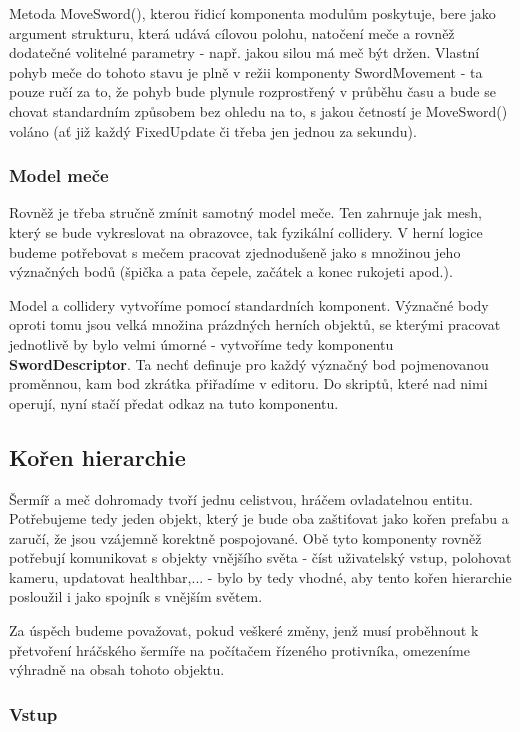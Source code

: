 Metoda MoveSword(), kterou řidicí komponenta modulům poskytuje, bere jako argument strukturu, která udává cílovou polohu, natočení meče a rovněž dodatečné volitelné parametry - např. jakou silou má meč být držen. Vlastní pohyb meče do tohoto stavu je plně v režii komponenty SwordMovement - ta pouze ručí za to, že pohyb bude plynule rozprostřený v průběhu času a bude se chovat standardním způsobem bez ohledu na to, s jakou četností je MoveSword() voláno (ať již každý FixedUpdate či třeba jen jednou za sekundu).

\subsubsection*{Model meče}

Rovněž je třeba stručně zmínit samotný model meče. Ten zahrnuje jak mesh, který se bude vykreslovat na obrazovce, tak fyzikální collidery. V herní logice budeme potřebovat s mečem pracovat zjednodušeně jako s množinou jeho význačných bodů (špička a pata čepele, začátek a konec rukojeti apod.).

Model a collidery vytvoříme pomocí standardních komponent. Význačné body oproti tomu jsou velká množina prázdných herních objektů, se kterými pracovat jednotlivě by bylo velmi úmorné - vytvoříme tedy komponentu \textbf{SwordDescriptor}. Ta nechť definuje pro každý význačný bod pojmenovanou proměnnou, kam bod zkrátka přiřadíme v editoru. Do skriptů, které nad nimi operují, nyní stačí předat odkaz na tuto komponentu.


\subsection{Kořen hierarchie} 

Šermíř a meč dohromady tvoří jednu celistvou, hráčem ovladatelnou entitu. Potřebujeme tedy jeden objekt, který je bude oba zaštiťovat jako kořen prefabu a zaručí, že jsou vzájemně korektně pospojované. Obě tyto komponenty rovněž potřebují komunikovat s objekty vnějšího světa - číst uživatelský vstup, polohovat kameru, updatovat healthbar,... - bylo by tedy vhodné, aby tento kořen hierarchie posloužil i jako spojník s vnějším světem. 

Za úspěch budeme považovat, pokud veškeré změny, jenž musí proběhnout k přetvoření hráčského šermíře na počítačem řízeného protivníka, omezeníme výhradně na obsah tohoto objektu.

\subsubsection*{Vstup}

